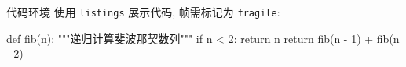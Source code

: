 
\begin{frame}[fragile]{代码环境}
  使用 \texttt{listings} 展示代码, 帧需标记为 \texttt{fragile}:

  \begin{code}[Python]
def fib(n):
    """递归计算斐波那契数列"""
    if n < 2:
        return n
    return fib(n - 1) + fib(n - 2)
  \end{code}
\end{frame}
